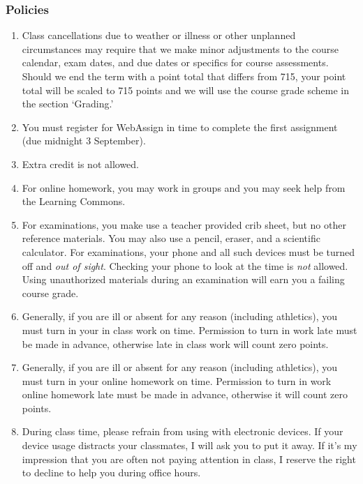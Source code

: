 \documentclass[12pt]{article}
\newcounter{ex}\setcounter{ex}{0}
\begin{document}
\subsubsection* {Policies}

\begin{enumerate}

\item Class cancellations due to weather or illness or other 
unplanned circumstances may require that we make minor adjustments
to the course calendar, exam dates, and due dates or specifics for 
course assessments. Should we end the term with a point total that
differs from 715, your point total will be scaled to 715 points and
we will use the course grade scheme in the section `Grading.'

\item You must register for WebAssign in time to complete the first 
assignment (due midnight 3 September).

\item Extra credit is not allowed. 

\item For online homework, you may work in groups and you may 
seek help from the Learning Commons. 

\item For examinations, you make use a teacher provided crib sheet, 
but no other reference materials. You may also use a pencil, eraser, 
and a scientific calculator. For examinations, your phone and all such
devices must be turned off and \emph{out of sight}. Checking your phone
to look at the time is \emph{not} allowed. Using unauthorized 
materials during an examination will earn you a failing course grade.

\item Generally, if you are ill or absent for any reason (including 
athletics), you must turn in your in class work on time. Permission to
turn in work late must be made in advance, otherwise late in class work 
will count zero points.

\item Generally,  if you are ill or absent for any reason (including 
athletics), you must turn in your online homework on time. Permission to
turn in work online homework late must be made in advance, otherwise it will
count zero points.
 

\item During class time, please refrain from using with electronic devices. If your 
device usage distracts your classmates, I will ask you to put it away. If it's my 
impression that you are often not paying attention in class, I reserve the right to 
decline to help you during office hours.


\end{enumerate}
\end{document}
